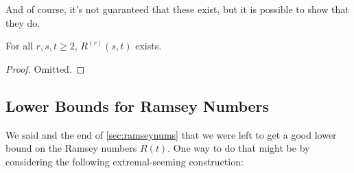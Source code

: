\documentclass[a4paper]{scrartcl}
\begin{document}
And of course, it's not guaranteed that these exist, but it is possible to show that they do.

\begin{theorem}
	For all $r, s, t \geq 2$, $R^{(r)}(s, t)$ exists.
\end{theorem}
\begin{proof}
	Omitted.\let\qed\relax
\end{proof}

\subsection{Lower Bounds for Ramsey Numbers}

We said and the end of \autoref{sec:ramseynums} that we were left to get a good lower bound on the Ramsey numbers $R(t)$. One way to do that might be by considering the following extremal-seeming construction:
\end{document}
